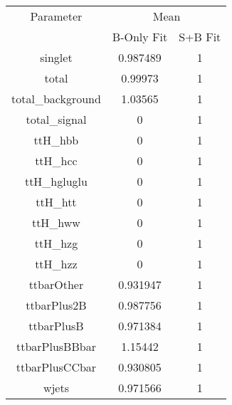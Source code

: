 \begin{table}
\centering

\begin{tabular}{ccc}
\toprule
Parameter 	& \multicolumn{2}{c}{Mean}\\
 	& B-Only Fit & S+B Fit\\
\midrule
singlet 	& \num{0.987489} 	& \num{1}\\
total 	& \num{0.99973} 	& \num{1}\\
total\_background 	& \num{1.03565} 	& \num{1}\\
total\_signal 	& \num{0} 	& \num{1}\\
ttH\_hbb 	& \num{0} 	& \num{1}\\
ttH\_hcc 	& \num{0} 	& \num{1}\\
ttH\_hgluglu 	& \num{0} 	& \num{1}\\
ttH\_htt 	& \num{0} 	& \num{1}\\
ttH\_hww 	& \num{0} 	& \num{1}\\
ttH\_hzg 	& \num{0} 	& \num{1}\\
ttH\_hzz 	& \num{0} 	& \num{1}\\
ttbarOther 	& \num{0.931947} 	& \num{1}\\
ttbarPlus2B 	& \num{0.987756} 	& \num{1}\\
ttbarPlusB 	& \num{0.971384} 	& \num{1}\\
ttbarPlusBBbar 	& \num{1.15442} 	& \num{1}\\
ttbarPlusCCbar 	& \num{0.930805} 	& \num{1}\\
wjets 	& \num{0.971566} 	& \num{1}\\
\bottomrule
\end{tabular}
\end{table}